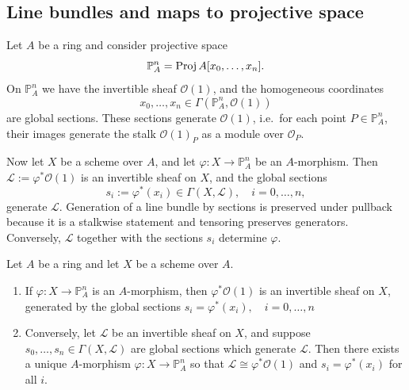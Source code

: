 \documentclass[12pt]{article}
\begin{document}
\subsection{Line bundles and maps to projective space}

Let $A$ be a ring and consider projective space
\[
    \mathbb P^n_A = \operatorname{Proj} A[x_0,\dots,x_n].
\]
On $\mathbb P^n_A$ we have the invertible sheaf $\mathcal O(1)$, and the homogeneous coordinates
\[
    x_0,\dots,x_n \in \Gamma(\mathbb P^n_A,\mathcal O(1))
\]
are global sections. These sections generate $\mathcal O(1)$, i.e.\ for each point $P \in \mathbb P^n_A$, their images generate the stalk $\mathcal O(1)_P$ as a module over $\mathcal O_{P}$.

Now let $X$ be a scheme over $A$, and let $\varphi : X \to \mathbb P^n_A$
be an $A$-morphism. Then $\mathcal L := \varphi^*\mathcal O(1)$
is an invertible sheaf on $X$, and the global sections
\[
    s_i := \varphi^*(x_i) \in \Gamma(X,\mathcal L), \quad i=0,\dots,n,
\]
generate $\mathcal L$. Generation of a line bundle by sections is preserved under pullback because it is a stalkwise statement and tensoring preserves generators. Conversely, $\mathcal L$ together with the sections $s_i$ determine $\varphi$.

\begin{theorem}
    Let $A$ be a ring and let $X$ be a scheme over $A$.
    \begin{enumerate}
        \item[(a)] If $\varphi : X \to \mathbb P^n_A$ is an $A$-morphism, then $\varphi^*\mathcal O(1)$ is an invertible sheaf on $X$, generated by the global sections $s_i = \varphi^*(x_i), \quad i=0,\dots,n$

        \item[(b)] Conversely, let $\mathcal L$ be an invertible sheaf on $X$, and suppose $s_0,\dots,s_n \in \Gamma(X,\mathcal L)$ are global sections which generate $\mathcal L$. Then there exists a unique $A$-morphism $\varphi : X \to \mathbb P^n_A$ so that $\mathcal L \cong \varphi^*\mathcal O(1)$ and $s_i = \varphi^*(x_i)$ for all $i$.
    \end{enumerate}
\end{theorem}
\end{document}
